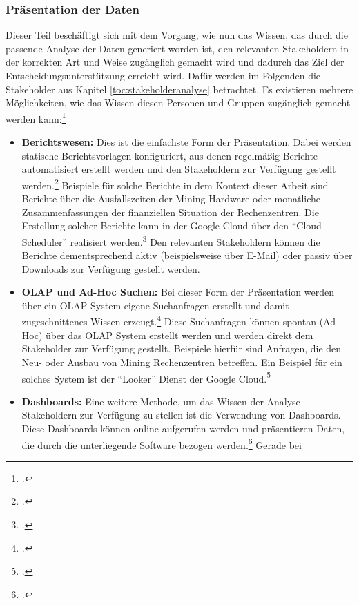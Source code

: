 \subsubsection{Präsentation der Daten} \label{toc:datenpraesentation}

Dieser Teil beschäftigt sich mit dem Vorgang, wie nun das Wissen, das durch die passende Analyse der Daten generiert worden ist, den
relevanten Stakeholdern in der korrekten Art und Weise zugänglich gemacht wird und dadurch das Ziel der Entscheidungsunterstützung
erreicht wird. Dafür werden im Folgenden die Stakeholder aus Kapitel \ref{toc:stakeholderanalyse} betrachtet. Es existieren mehrere
Möglichkeiten, wie das Wissen diesen Personen und Gruppen zugänglich gemacht werden kann:\footcite[Vgl.][Kap. 19]{loshin2012business}
\begin{itemize}
    \item \textbf{Berichtswesen: }Dies ist die einfachste Form der Präsentation. Dabei werden
    statische Berichtsvorlagen konfiguriert, aus denen regelmäßig Berichte automatisiert erstellt werden und den Stakeholdern zur Verfügung
    gestellt werden.\footcite[Vgl.][S. 305]{loshin2012business} Beispiele für solche Berichte in dem Kontext dieser Arbeit sind Berichte über die Ausfallszeiten der Mining
    Hardware oder monatliche Zusammenfassungen der finanziellen Situation der Rechenzentren. Die Erstellung solcher Berichte kann in
    der Google Cloud über den "`Cloud Scheduler"' realisiert werden.\footcite[Vgl.][]{googlecloud2021scheduler} Den relevanten Stakeholdern können die Berichte dementsprechend
    aktiv (beispielsweise über E-Mail) oder passiv über Downloads zur Verfügung gestellt werden.
    \item \textbf{\ac{OLAP} und Ad-Hoc Suchen: }Bei dieser Form der Präsentation werden über ein \ac{OLAP} System eigene Suchanfragen erstellt
    und damit zugeschnittenes Wissen erzeugt.\footcite[Vgl.][S. 308f]{loshin2012business}
    Diese Suchanfragen können spontan (Ad-Hoc) über das \ac{OLAP} System erstellt werden
    und werden direkt dem Stakeholder zur Verfügung gestellt. Beispiele hierfür sind Anfragen, die den Neu- oder
    Ausbau von Mining Rechenzentren betreffen. Ein Beispiel für ein solches System ist der "`Looker"' Dienst der
    Google Cloud.\footcite[Vgl.][]{googlecloud2021dw}
    \item \textbf{Dashboards: }Eine weitere Methode, um das Wissen der Analyse Stakeholdern
    zur Verfügung zu stellen ist die Verwendung von Dashboards. Diese Dashboards
    können online aufgerufen werden und präsentieren Daten, die durch die unterliegende Software bezogen werden.\footcite[Vgl.][S. 314f]{loshin2012business} Gerade bei

\end{itemize}
